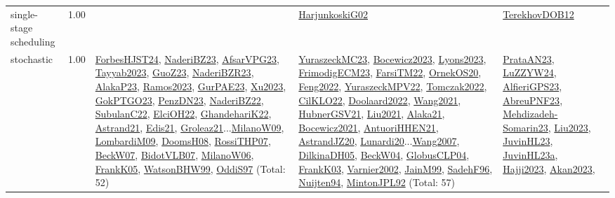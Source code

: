 {\begin{longtable}{p{3cm}r>{\raggedright\arraybackslash}p{6cm}>{\raggedright\arraybackslash}p{6cm}>{\raggedright\arraybackslash}p{8cm}}
\index{single-stage scheduling}\index{Concepts!single-stage scheduling}single-stage scheduling &  1.00 &  & \hyperref[detail:HarjunkoskiG02]{HarjunkoskiG02} & \hyperref[detail:TerekhovDOB12]{TerekhovDOB12}\\
\index{stochastic}\index{Concepts!stochastic}stochastic &  1.00 & \hyperref[detail:ForbesHJST24]{ForbesHJST24}, \hyperref[detail:NaderiBZ23]{NaderiBZ23}, \hyperref[detail:AfsarVPG23]{AfsarVPG23}, \hyperref[detail:Tayyab2023]{Tayyab2023}, \hyperref[detail:GuoZ23]{GuoZ23}, \hyperref[detail:NaderiBZR23]{NaderiBZR23}, \hyperref[detail:AlakaP23]{AlakaP23}, \hyperref[detail:Ramos2023]{Ramos2023}, \hyperref[detail:GurPAE23]{GurPAE23}, \hyperref[detail:Xu2023]{Xu2023}, \hyperref[detail:GokPTGO23]{GokPTGO23}, \hyperref[detail:PenzDN23]{PenzDN23}, \hyperref[detail:NaderiBZ22]{NaderiBZ22}, \hyperref[detail:SubulanC22]{SubulanC22}, \hyperref[detail:ElciOH22]{ElciOH22}, \hyperref[detail:GhandehariK22]{GhandehariK22}, \hyperref[detail:Astrand21]{Astrand21}, \hyperref[detail:Edis21]{Edis21}, \hyperref[detail:Groleaz21]{Groleaz21}...\hyperref[detail:MilanoW09]{MilanoW09}, \hyperref[detail:LombardiM09]{LombardiM09}, \hyperref[detail:DoomsH08]{DoomsH08}, \hyperref[detail:RossiTHP07]{RossiTHP07}, \hyperref[detail:BeckW07]{BeckW07}, \hyperref[detail:BidotVLB07]{BidotVLB07}, \hyperref[detail:MilanoW06]{MilanoW06}, \hyperref[detail:FrankK05]{FrankK05}, \hyperref[detail:WatsonBHW99]{WatsonBHW99}, \hyperref[detail:OddiS97]{OddiS97} (Total: 52) & \hyperref[detail:YuraszeckMC23]{YuraszeckMC23}, \hyperref[detail:Bocewicz2023]{Bocewicz2023}, \hyperref[detail:Lyons2023]{Lyons2023}, \hyperref[detail:FrimodigECM23]{FrimodigECM23}, \hyperref[detail:FarsiTM22]{FarsiTM22}, \hyperref[detail:OrnekOS20]{OrnekOS20}, \hyperref[detail:Feng2022]{Feng2022}, \hyperref[detail:YuraszeckMPV22]{YuraszeckMPV22}, \hyperref[detail:Tomczak2022]{Tomczak2022}, \hyperref[detail:CilKLO22]{CilKLO22}, \hyperref[detail:Doolaard2022]{Doolaard2022}, \hyperref[detail:Wang2021]{Wang2021}, \hyperref[detail:HubnerGSV21]{HubnerGSV21}, \hyperref[detail:Liu2021]{Liu2021}, \hyperref[detail:Alaka21]{Alaka21}, \hyperref[detail:Bocewicz2021]{Bocewicz2021}, \hyperref[detail:AntuoriHHEN21]{AntuoriHHEN21}, \hyperref[detail:AstrandJZ20]{AstrandJZ20}, \hyperref[detail:Lunardi20]{Lunardi20}...\hyperref[detail:Wang2007]{Wang2007}, \hyperref[detail:DilkinaDH05]{DilkinaDH05}, \hyperref[detail:BeckW04]{BeckW04}, \hyperref[detail:GlobusCLP04]{GlobusCLP04}, \hyperref[detail:FrankK03]{FrankK03}, \hyperref[detail:Varnier2002]{Varnier2002}, \hyperref[detail:JainM99]{JainM99}, \hyperref[detail:SadehF96]{SadehF96}, \hyperref[detail:Nuijten94]{Nuijten94}, \hyperref[detail:MintonJPL92]{MintonJPL92} (Total: 57) & \hyperref[detail:PrataAN23]{PrataAN23}, \hyperref[detail:LuZZYW24]{LuZZYW24}, \hyperref[detail:AlfieriGPS23]{AlfieriGPS23}, \hyperref[detail:AbreuPNF23]{AbreuPNF23}, \hyperref[detail:Mehdizadeh-Somarin23]{Mehdizadeh-Somarin23}, \hyperref[detail:Liu2023]{Liu2023}, \hyperref[detail:JuvinHL23]{JuvinHL23}, \hyperref[detail:JuvinHL23a]{JuvinHL23a}, \hyperref[detail:Hajji2023]{Hajji2023}, \hyperref[detail:Akan2023]{Akan2023}, 
\end{longtable}}
